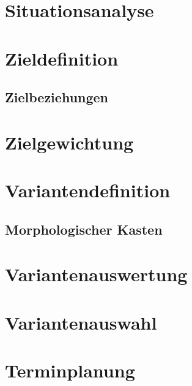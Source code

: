\section{Situationsanalyse}

\section{Zieldefinition}

\subsection{Zielbeziehungen}

\section{Zielgewichtung}\label{sec:zielgewichtung}

\section{Variantendefinition}
\subsection{Morphologischer Kasten}


\section{Variantenauswertung}

\section{Variantenauswahl}

\section{Terminplanung}
